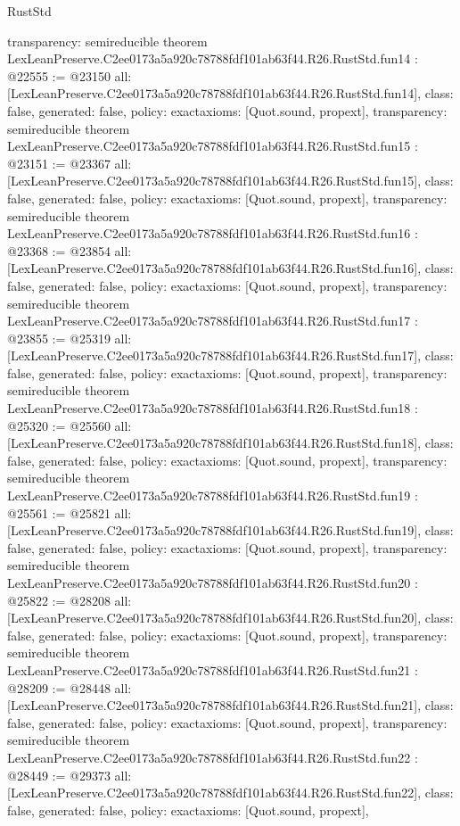 \begin{lexlean}{RustStd}
\begin{coremodule}
{  transparency: semireducible
}
theorem LexLeanPreserve.C2ee0173a5a920c78788fdf101ab63f44.R26.RustStd.fun14 : @22555 := @23150 {
  all: [LexLeanPreserve.C2ee0173a5a920c78788fdf101ab63f44.R26.RustStd.fun14],
  class: false,
  generated: false,
  policy: exact{axioms: [Quot.sound, propext]},
  transparency: semireducible
}
theorem LexLeanPreserve.C2ee0173a5a920c78788fdf101ab63f44.R26.RustStd.fun15 : @23151 := @23367 {
  all: [LexLeanPreserve.C2ee0173a5a920c78788fdf101ab63f44.R26.RustStd.fun15],
  class: false,
  generated: false,
  policy: exact{axioms: [Quot.sound, propext]},
  transparency: semireducible
}
theorem LexLeanPreserve.C2ee0173a5a920c78788fdf101ab63f44.R26.RustStd.fun16 : @23368 := @23854 {
  all: [LexLeanPreserve.C2ee0173a5a920c78788fdf101ab63f44.R26.RustStd.fun16],
  class: false,
  generated: false,
  policy: exact{axioms: [Quot.sound, propext]},
  transparency: semireducible
}
theorem LexLeanPreserve.C2ee0173a5a920c78788fdf101ab63f44.R26.RustStd.fun17 : @23855 := @25319 {
  all: [LexLeanPreserve.C2ee0173a5a920c78788fdf101ab63f44.R26.RustStd.fun17],
  class: false,
  generated: false,
  policy: exact{axioms: [Quot.sound, propext]},
  transparency: semireducible
}
theorem LexLeanPreserve.C2ee0173a5a920c78788fdf101ab63f44.R26.RustStd.fun18 : @25320 := @25560 {
  all: [LexLeanPreserve.C2ee0173a5a920c78788fdf101ab63f44.R26.RustStd.fun18],
  class: false,
  generated: false,
  policy: exact{axioms: [Quot.sound, propext]},
  transparency: semireducible
}
theorem LexLeanPreserve.C2ee0173a5a920c78788fdf101ab63f44.R26.RustStd.fun19 : @25561 := @25821 {
  all: [LexLeanPreserve.C2ee0173a5a920c78788fdf101ab63f44.R26.RustStd.fun19],
  class: false,
  generated: false,
  policy: exact{axioms: [Quot.sound, propext]},
  transparency: semireducible
}
theorem LexLeanPreserve.C2ee0173a5a920c78788fdf101ab63f44.R26.RustStd.fun20 : @25822 := @28208 {
  all: [LexLeanPreserve.C2ee0173a5a920c78788fdf101ab63f44.R26.RustStd.fun20],
  class: false,
  generated: false,
  policy: exact{axioms: [Quot.sound, propext]},
  transparency: semireducible
}
theorem LexLeanPreserve.C2ee0173a5a920c78788fdf101ab63f44.R26.RustStd.fun21 : @28209 := @28448 {
  all: [LexLeanPreserve.C2ee0173a5a920c78788fdf101ab63f44.R26.RustStd.fun21],
  class: false,
  generated: false,
  policy: exact{axioms: [Quot.sound, propext]},
  transparency: semireducible
}
theorem LexLeanPreserve.C2ee0173a5a920c78788fdf101ab63f44.R26.RustStd.fun22 : @28449 := @29373 {
  all: [LexLeanPreserve.C2ee0173a5a920c78788fdf101ab63f44.R26.RustStd.fun22],
  class: false,
  generated: false,
  policy: exact{axioms: [Quot.sound, propext]},
}
\end{coremodule}
\end{lexlean}

